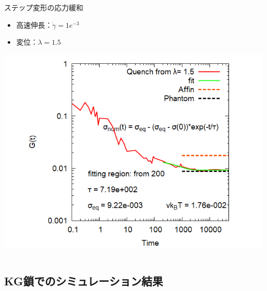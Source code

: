 \documentclass[12pt, dvipdfmx]{beamer}
\begin{document}
\begin{frame}
\begin{columns}[totalwidth=\linewidth]
\begin{exampleblock}{ステップ変形の応力緩和}
\begin{itemize}
                        \item 高速伸長：$\dot{\gamma} = 1e^{-3}$
                        \item 変位：$\lambda = 1.5$
                    \end{itemize}
					\begin{center}
                        \includegraphics[width=.9\columnwidth]{gt_sunuke.png}
                    \end{center}
				\end{exampleblock}
		\end{columns}
\end{frame}

\subsection{KG鎖でのシミュレーション結果}

				
\end{document}

